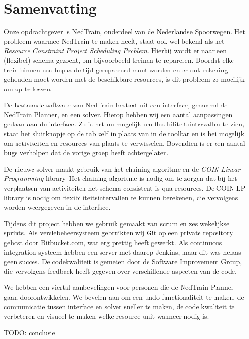 \section*{Samenvatting}

Onze opdrachtgever is NedTrain, onderdeel van de Nederlandse Spoorwegen. Het probleem waarmee NedTrain te maken heeft, staat ook wel bekend als het \emph{Resource Constraint Project Scheduling Problem}. Hierbij wordt er naar een (flexibel) schema gezocht, om bijvoorbeeld treinen te repareren. Doordat elke trein binnen een bepaalde tijd gerepareerd moet worden en er ook rekening gehouden moet worden met de beschikbare resources, is dit probleem zo moeilijk om op te lossen.

De bestaande software van NedTrain bestaat uit een interface, genaamd de NedTrain Planner, en een solver. Hierop hebben wij een aantal aanpassingen gedaan aan de interface. Zo is het nu mogelijk om flexibiliteitsintervallen te zien, staat het sluitknopje op de tab zelf in plaats van in de toolbar en is het mogelijk om activiteiten en resources van plaats te verwisselen. Bovendien is er een aantal bugs verholpen dat de vorige groep heeft achtergelaten. 

De nieuwe solver maakt gebruik van het chaining algoritme en de \emph{COIN Linear Programming} library. Het chaining algoritme is nodig om te zorgen dat bij het verplaatsen van activiteiten het schema consistent is qua resources. De COIN LP library is nodig om flexibiliteitsintervallen te kunnen berekenen, die vervolgens worden weergegeven in de interface. 

Tijdens dit project hebben we gebruik gemaakt van scrum en zes wekelijkse sprints. Als versiebeheersysteem gebruikten wij Git op een private repository gehost door \href{http://bitbucket.com}{Bitbucket.com}, wat erg prettig heeft gewerkt. Als continuous integration systeem hebben een server met daarop Jenkins, maar dit was helaas geen succes. De codekwaliteit is gemeten door de Software Improvement Group, die vervolgens feedback heeft gegeven over verschillende aspecten van de code. 

We hebben een viertal aanbevelingen voor personen die de NedTrain Planner gaan doorontwikkelen. We bevelen aan om een undo-functionaliteit te maken, de communicatie tussen interface en solver sneller te maken, de code kwaliteit te verbeteren en visueel te maken welke resource unit wanneer nodig is. 

TODO: conclusie
